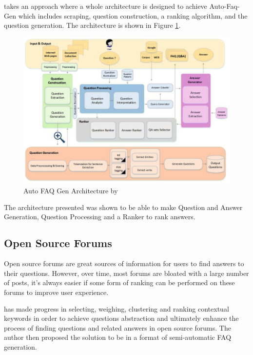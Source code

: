 \cite{10.1007/978-3-319-18356-5_30} \cite{10.1145/1099554.1099571} takes an approach where a whole architecture is designed to achieve Auto-Faq-Gen which includes scraping, question construction, a ranking algorithm, and the question generation. The architecture is shown in Figure \ref{auto-faq-gen-arch}.

\begin{figure}[H]
  \noindent \includegraphics[scale=0.87]{assets/auto-faq-gen-architecture.png}
\caption{Auto FAQ Gen Architecture by \protect{}}\label{auto-faq-gen-arch}
\end{figure}

The architecture presented was shown to be able to make Question and Answer Generation, Question Processing and a Ranker to rank answers.

\pagebreak
\subsection{Open Source Forums}
Open source forums are great sources of information for users to find answers to their questions. However, over time, most forums are bloated with a large number of posts, it's always easier if some form of ranking can be performed on these forums to improve user experience.  

\cite{5615722} \cite{10.1007/978-3-319-42911-3_25} has made progress in selecting, weighing, clustering and ranking contextual keywords in order to achieve questions abstraction and ultimately enhance the process of finding questions and related answers in open source forums. The author then proposed the solution to be in a format of semi-automatic FAQ generation.

